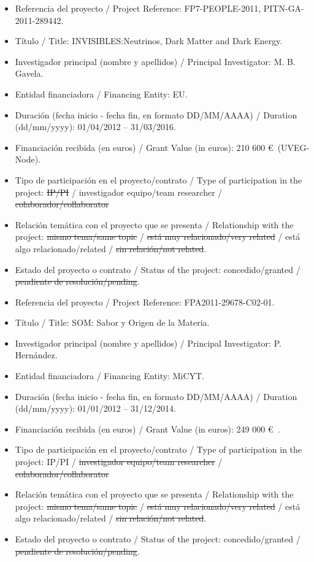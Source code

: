 \vspace{24pt}

\begin{itemize}
\item Referencia del proyecto / Project Reference: FP7-PEOPLE-2011, PITN-GA-2011-289442.
\item T\'itulo / Title: INVISIBLES:Neutrinos, Dark Matter and Dark Energy.
\item Investigador principal (nombre y apellidos) / Principal Investigator: M. B. Gavela.
\item Entidad financiadora / Financing Entity: EU.
\item Duraci\'on (fecha inicio - fecha fin, en formato DD/MM/AAAA) / Duration (dd/mm/yyyy): 01/04/2012 -- 31/03/2016.
\item Financiaci\'on recibida (en euros) / Grant Value (in euros): 210 600 \euro\ (UVEG-Node).
\item Tipo de participaci\'on en el proyecto/contrato / Type of participation in the project: \st{IP/PI} / investigador equipo/team researcher / \st{colaborador/collaborator}
\item Relaci\'on tem\'atica con el proyecto que se presenta  /  Relationship with the project: \st{mismo tema/same topic} / \st{est\'a muy relacionado/very related} / est\'a algo relacionado/related / \st{sin relaci\'on/not related}.
\item Estado del proyecto o contrato / Status of the project: concedido/granted   /  \st{pendiente de resoluci\'on/pending}.
\end{itemize}

\vspace{24pt}

\begin{itemize}
\item Referencia del proyecto / Project Reference: FPA2011-29678-C02-01.
\item T\'itulo / Title: SOM: Sabor y Origen de la Materia.
\item Investigador principal (nombre y apellidos) / Principal Investigator: P. Hern\'andez.
\item Entidad financiadora / Financing Entity: MiCYT.
\item Duraci\'on (fecha inicio - fecha fin, en formato DD/MM/AAAA) / Duration (dd/mm/yyyy): 01/01/2012 -- 31/12/2014.
\item Financiaci\'on recibida (en euros) / Grant Value (in euros): 249 000 \euro\ .
\item Tipo de participaci\'on en el proyecto/contrato / Type of participation in the project: IP/PI / \st{investigador equipo/team researcher} / \st{colaborador/collaborator}
\item Relaci\'on tem\'atica con el proyecto que se presenta  /  Relationship with the project: \st{mismo tema/same topic} / \st{est\'a muy relacionado/very related} / est\'a algo relacionado/related / \st{sin relaci\'on/not related}.
\item Estado del proyecto o contrato / Status of the project: concedido/granted   /  \st{pendiente de resoluci\'on/pending}.
\end{itemize}

